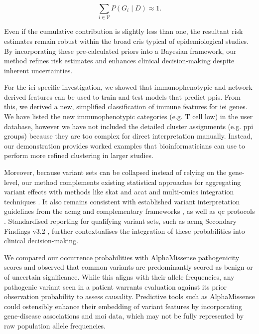 \[
\sum_{i\in\mathcal{V}} P(G_i\mid D) \approx 1.
\]

Even if the cumulative contribution is slightly less than one, the resultant risk estimates remain robust within the broad \ac{cri}s typical of epidemiological studies. 
By incorporating these pre-calculated priors into a Bayesian framework, our method refines risk estimates and enhances clinical decision-making despite inherent uncertainties.

For the \ac{iei}-specific investigation, 
we showed that immunophenotypic and network-derived features can be used to train and test models that predict \ac{ppi}s. From this, we derived a new, simplified classification of immune features for \ac{iei} genes. We have listed the new immunophenotypic categories (e.g. T cell low)  in the user database, however we have not included the detailed cluster assignments (e.g. \ac{ppi} groups) because they are too complex for direct interpretation manually. Instead, our demonstration provides worked examples that bioinformaticians can use to perform more refined clustering in larger studies.

Moreover, because variant sets can be collapsed instead of relying on the gene-level, our method complements existing statistical approaches for aggregating variant effects with methods like \ac{skat} and \ac{acat} \cite{liu2019acat,li2020dynamic,wu2011rare,lee2012optimal} and multi-omics integration techniques \cite{kong2018nature,howe2021within}.
It also remains consistent with established variant interpretation guidelines from the \ac{acmg} \cite{richards2015standards} and complementary frameworks \cite{tavtigian2020fitting,li2017intervar}, as well as \ac{qc} protocols \cite{pedersen2021effective,anderson2010data}. 
Standardised reporting for qualifying variant sets, such as \ac{acmg} Secondary Findings v3.2 \cite{miller2023acmg}, further contextualises the integration of these probabilities into clinical decision-making.

We compared our occurrence probabilities with AlphaMissense pathogenicity scores and observed that common variants are predominantly scored as benign or of uncertain significance. While this aligns with their allele frequencies, any pathogenic variant seen in a patient warrants evaluation against its prior observation probability to assess causality. Predictive tools such as AlphaMissense could ostensibly enhance their embedding of variant features by incorporating gene-disease associations and \ac{moi} data, which may not be fully represented by raw population allele frequencies.


